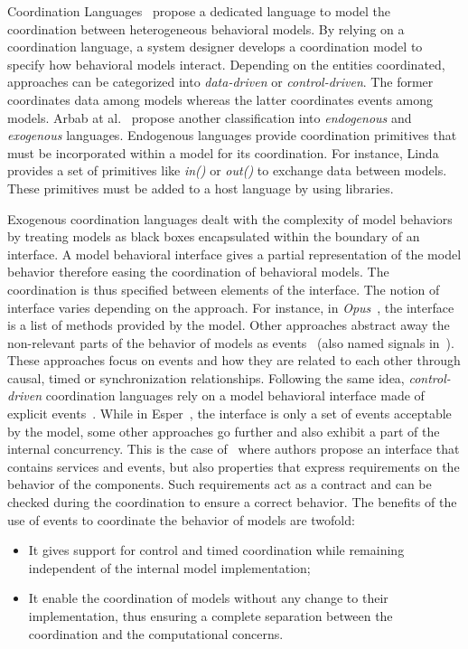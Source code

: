 Coordination Languages~\cite{coordsignibib} propose a dedicated language to model the coordination between heterogeneous behavioral models. By relying on a coordination language, a system designer develops a coordination model to specify how behavioral models interact. Depending on the entities coordinated, approaches can be categorized into \emph{data-driven} or \emph{control-driven}. The former coordinates data among models whereas the latter coordinates events among models. Arbab at al.~\cite{whatdocoord} propose another classification into \emph{endogenous} and \emph{exogenous} languages. Endogenous languages provide coordination primitives that must be incorporated within a model for its coordination. For instance, Linda~\cite{lindabib} provides a set of primitives like \emph{in()} or \emph{out()} to exchange data between models. These primitives must be added to a host language by using libraries. 

Exogenous coordination languages dealt with the complexity of model behaviors by treating models as black boxes encapsulated within the boundary of an interface. A model behavioral interface gives a partial representation of the model behavior therefore easing the coordination of behavioral models. The coordination is thus specified between elements of the interface. The notion of interface varies depending on the approach. For instance, in \emph{Opus}~\cite{Opus}, the interface is a list of methods provided by the model. Other approaches abstract away the non-relevant parts of the behavior of models as events~\cite{eventStructures} (also named signals in~\cite{lee1998framework}). These approaches focus on events and how they are related to each other through causal, timed or synchronization relationships. Following the same idea, \emph{control-driven} coordination languages rely on a model behavioral interface made of explicit events~\cite{esperbib,manifoldbib,coordinainterfacebib}. While in Esper~\cite{esperbib}, the interface is only a set of events acceptable by the model, some other approaches go further and also exhibit a part of the internal concurrency. This is the case of~\cite{coordinainterfacebib} where authors propose an interface that contains services and events, but also properties that express requirements on the behavior of the components. Such requirements act as a contract and can be checked during the coordination to ensure a correct behavior. The benefits of the use of events to coordinate the behavior of models are twofold:
\begin{itemize}	
	\item It gives support for control and timed coordination while remaining independent of the internal model implementation;
	\item It enable the coordination of models without any change to their implementation, thus ensuring a complete separation between the coordination and the computational concerns.
\end{itemize}

